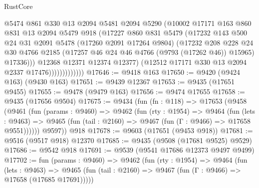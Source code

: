 \begin{lexlean}{RustCore}
\begin{coremodule}
                            @5474
                            @861
                            @330
                            @13
                            @2094
                            @5481
                            @2094
                            @5290
                            (@10002
                              @17171
                              @163
                              @860
                              @831
                              @13
                              @2094
                              @5479
                              @918
                              (@17227
                                @860
                                @831
                                @5479
                                (@17232
                                  @143
                                  @500
                                  @24
                                  @31
                                  @2091
                                  @5478
                                  (@17260 @2091 @17264 @9804)
                                  (@17232
                                    @208
                                    @228
                                    @24
                                    @30
                                    @4766
                                    @2185
                                    (@17257 @46 @24 @46 @4766 (@9793 (@17262 @46)) @15965)
                                    @17336)))
                              @12368
                              @12371
                              @12374
                              @12377)
                            (@12512 @17171 @330 @13 @2094 @2337 @17476)))))))))))))
@17646 := @9418 @163
@17650 := @9420 (@9424 @163) (@9430 @163)
@17651 := @9439 @12367
@17653 := @9435 (@17651 @9455)
@17655 := @9478 (@9479 @163)
@17656 := @9474 @17655
@17658 := @9435 (@17656 @9504)
@17675 := @9434
    (fun (fn : @118) =>
    @17653
      (@9458
        (@9461
          (fun (params : @9460) =>
          @9462
            (fun (rty : @1954) =>
            @9464
              (fun (lets : @9463) =>
              @9465 (fun (tail : @2160) => @9467 (fun (Γ : @9466) => @17658 @9551))))))
        @9597))
    @918
@17678 := @9603 (@17651 (@9453 @918))
@17681 := @9516 (@9517 @918) @12370
@17685 := @9435 (@9508 (@17681 @9525) @9529)
@17686 := @9542 @918
@17691 := @9539 (@9541 @17686 @12373 @9497 @9499)
@17702 := fun (params : @9460) =>
  @9462
    (fun (rty : @1954) =>
    @9464
      (fun (lets : @9463) =>
      @9465 (fun (tail : @2160) => @9467 (fun (Γ : @9466) => @17658 (@17685 @17691)))))

\end{coremodule}
\end{lexlean}
